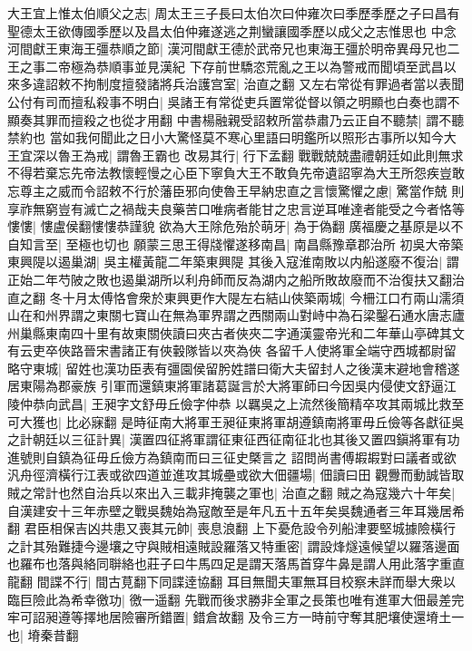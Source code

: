 大王宜上惟太伯順父之志|{
	周太王三子長曰太伯次曰仲雍次曰季歷季歷之子曰昌有聖德太王欲傳國季歷以及昌太伯仲雍遂逃之荆蠻讓國季歷以成父之志惟思也}
中念河間獻王東海王彊恭順之節|{
	漢河間獻王德於武帝兄也東海王彊於明帝異母兄也二王之事二帝極為恭順事並見漢紀}
下存前世驕恣荒亂之王以為警戒而聞頃至武昌以來多違詔敕不拘制度擅發諸將兵治護宫室|{
	治直之翻}
又左右常從有罪過者當以表聞公付有司而擅私殺事不明白|{
	吳諸王有常從吏兵置常從督以領之明顯也白奏也謂不顯奏其罪而擅殺之也從才用翻}
中書楊融親受詔敕所當恭肅乃云正自不聽禁|{
	謂不聽禁約也}
當如我何聞此之日小大驚怪莫不寒心里語曰明鑑所以照形古事所以知今大王宜深以魯王為戒|{
	謂魯王霸也}
改易其行|{
	行下孟翻}
戰戰兢兢盡禮朝廷如此則無求不得若棄忘先帝法教懷輕慢之心臣下寧負大王不敢負先帝遺詔寧為大王所怨疾豈敢忘尊主之威而令詔敕不行於藩臣邪向使魯王早納忠直之言懷驚懼之慮|{
	驚當作兢}
則享祚無窮豈有滅亡之禍哉夫良藥苦口唯病者能甘之忠言逆耳唯達者能受之今者恪等慺慺|{
	慺盧侯翻慺慺恭謹貌}
欲為大王除危殆於萌牙|{
	為于偽翻}
廣福慶之基原是以不自知言至|{
	至極也切也}
願蒙三思王得牋懼遂移南昌|{
	南昌縣豫章郡治所}
初吳大帝築東興隄以遏巢湖|{
	吳主權黃龍二年築東興隄}
其後入寇淮南敗以内船遂廢不復治|{
	謂正始二年芍陂之敗也遏巢湖所以利舟師而反為湖内之船所敗故廢而不治復扶又翻治直之翻}
冬十月太傅恪會衆於東興更作大隄左右結山俠築兩城|{
	今柵江口冇兩山濡須山在和州界謂之東關七寶山在無為軍界謂之西關兩山對峙中為石梁鑿石通水唐志廬州巢縣東南四十里有故東關俠讀曰夾古者俠夾二字通漢靈帝光和二年華山亭碑其文有云吏卒俠路晉宋書諸正有俠轂隊皆以夾為俠}
各留千人使將軍全端守西城都尉留略守東城|{
	留姓也漢功臣表有彊園侯留肹姓譜曰衛大夫留封人之後漢末避地會稽遂居東陽為郡豪族}
引軍而還鎮東將軍諸葛誕言於大將軍師曰今因吳内侵使文舒逼江陵仲恭向武昌|{
	王昶字文舒毋丘儉字仲恭}
以羈吳之上流然後簡精卒攻其兩城比救至可大獲也|{
	比必寐翻}
是時征南大將軍王昶征東將軍胡遵鎮南將軍毋丘儉等各獻征吳之計朝廷以三征計異|{
	漢置四征將軍謂征東征西征南征北也其後又置四鎭將軍有功進號則自鎮為征毋丘儉方為鎮南而曰三征史槩言之}
詔問尚書傅嘏嘏對曰議者或欲汎舟徑濟橫行江表或欲四道並進攻其城壘或欲大佃疆場|{
	佃讀曰田}
觀釁而動誠皆取賊之常計也然自治兵以來出入三載非掩襲之軍也|{
	治直之翻}
賊之為寇幾六十年矣|{
	自漢建安十三年赤壁之戰吳魏始為寇敵至是年凡五十五年矣吳魏通者三年耳幾居希翻}
君臣相保吉凶共患又喪其元帥|{
	喪息浪翻}
上下憂危設令列船津要堅城據險橫行之計其殆難捷今邊壤之守與賊相遠賊設羅落又特重密|{
	謂設烽燧遠候望以羅落邊面也羅布也落與絡同聨絡也莊子曰牛馬四足是謂天落馬首穿牛鼻是謂人用此落字重直龍翻}
間諜不行|{
	間古莧翻下同諜逹協翻}
耳目無聞夫軍無耳目校察未詳而舉大衆以臨巨險此為希幸徼功|{
	徼一遥翻}
先戰而後求勝非全軍之長策也唯有進軍大佃最差完牢可詔昶遵等擇地居險審所錯置|{
	錯倉故翻}
及令三方一時前守奪其肥壤使還塉土一也|{
	塉秦昔翻}
